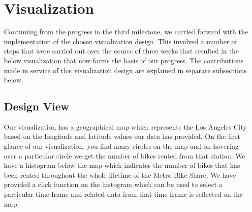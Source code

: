 \section{Visualization} 
\label{sec:visualization}

Continuing from the progress in the third milestone, we carried forward with the implementation of the chosen visualization design. This involved a number of steps that were carried out over the course of three weeks that resulted in the below visualization that now forms the basis of our progress. The contributions made in service of this visualization design are explained in separate subsections below.

\subsection{Design View}
\label{sec:design view}
Our visualization has a geographical map which represents the Los Angeles City based on the longitude and latitude values our data has provided. On the first glance of our visualization, you find many circles on the map and on hovering over a particular circle we get the number of bikes rented from that station. We have a histogram below the map which indicates the number of bikes that has been rented throughout the whole lifetime of the Metro Bike Share. We have provided a click function on the histogram which can be used to select a particular time-frame and related data from that time frame is reflected on the map.
